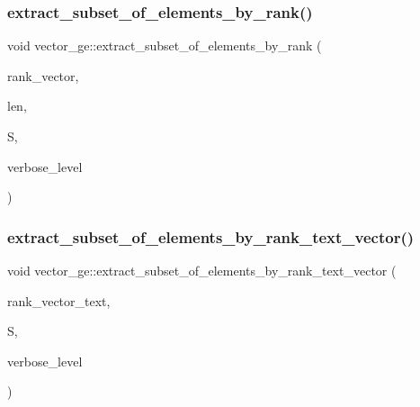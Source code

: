 \mbox{\label{classvector__ge_a84d1cf9cccccb972ff761bd57eded556}} 
\subsubsection{\texorpdfstring{extract\+\_\+subset\+\_\+of\+\_\+elements\+\_\+by\+\_\+rank()}{extract\_subset\_of\_elements\_by\_rank()}}
{\footnotesize\ttfamily void vector\+\_\+ge\+::extract\+\_\+subset\+\_\+of\+\_\+elements\+\_\+by\+\_\+rank (\begin{DoxyParamCaption}\item[{\mbox{\hyperlink{galois_8h_a09fddde158a3a20bd2dcadb609de11dc}{I\+NT}} $\ast$}]{rank\+\_\+vector,  }\item[{\mbox{\hyperlink{galois_8h_a09fddde158a3a20bd2dcadb609de11dc}{I\+NT}}}]{len,  }\item[{\mbox{\hyperlink{classsims}{sims}} $\ast$}]{S,  }\item[{\mbox{\hyperlink{galois_8h_a09fddde158a3a20bd2dcadb609de11dc}{I\+NT}}}]{verbose\+\_\+level }\end{DoxyParamCaption})}

\mbox{\label{classvector__ge_a9e5254c6ef59836510553bef6dedb908}} 
\subsubsection{\texorpdfstring{extract\+\_\+subset\+\_\+of\+\_\+elements\+\_\+by\+\_\+rank\+\_\+text\+\_\+vector()}{extract\_subset\_of\_elements\_by\_rank\_text\_vector()}}
{\footnotesize\ttfamily void vector\+\_\+ge\+::extract\+\_\+subset\+\_\+of\+\_\+elements\+\_\+by\+\_\+rank\+\_\+text\+\_\+vector (\begin{DoxyParamCaption}\item[{const \mbox{\hyperlink{galois_8h_ab6cc7b4aeb6ea31aba2b3fbfc83ff5e6}{B\+Y\+TE}} $\ast$}]{rank\+\_\+vector\+\_\+text,  }\item[{\mbox{\hyperlink{classsims}{sims}} $\ast$}]{S,  }\item[{\mbox{\hyperlink{galois_8h_a09fddde158a3a20bd2dcadb609de11dc}{I\+NT}}}]{verbose\+\_\+level }\end{DoxyParamCaption})}

